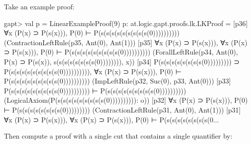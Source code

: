 \documentclass[a4paper,11pt]{article}
\begin{document}
Take an example proof:
\begin{clilisting}
gapt> val p = LinearExampleProof(9)
p: at.logic.gapt.proofs.lk.LKProof =
[p36] ∀x (P(x) ⊃ P(s(x))), P(0) ⊢ P(s(s(s(s(s(s(s(s(s(0))))))))))    (ContractionLeftRule(p35, Ant(0), Ant(1)))
[p35] ∀x (P(x) ⊃ P(s(x))),
∀x (P(x) ⊃ P(s(x))),
P(0)
⊢
P(s(s(s(s(s(s(s(s(s(0))))))))))    (ForallLeftRule(p34, Ant(0), P(x) ⊃ P(s(x)), s(s(s(s(s(s(s(s(0)))))))), x))
[p34] P(s(s(s(s(s(s(s(s(0))))))))) ⊃ P(s(s(s(s(s(s(s(s(s(0)))))))))),
∀x (P(x) ⊃ P(s(x))),
P(0)
⊢
P(s(s(s(s(s(s(s(s(s(0))))))))))    (ImpLeftRule(p32, Suc(0), p33, Ant(0)))
[p33] P(s(s(s(s(s(s(s(s(s(0)))))))))) ⊢ P(s(s(s(s(s(s(s(s(s(0))))))))))    (LogicalAxiom(P(s(s(s(s(s(s(s(s(s(0)))))))))): o))
[p32] ∀x (P(x) ⊃ P(s(x))), P(0) ⊢ P(s(s(s(s(s(s(s(s(0)))))))))    (ContractionLeftRule(p31, Ant(0), Ant(1)))
[p31] ∀x (P(x) ⊃ P(s(x))),
∀x (P(x) ⊃ P(s(x))),
P(0)
⊢
P(s(s(s(s(s(s(s(s(0...
\end{clilisting}
Then compute a proof with a single cut that contains a single quantifier by:
\end{document}
